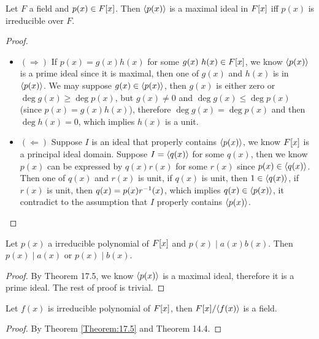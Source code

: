 \documentclass[../main.tex]{subfiles}
\begin{document}
\setcounter{theorem}{4}
\begin{theorem}
  \label{Theorem:17.5}
  Let $F$ a field and $p(x) \in F[x]$. Then $\langle p(x) \rangle$ is a maximal ideal
  in $F[x]$ iff $p(x)$ is irreducible over $F$.
\end{theorem}
\begin{proof}
  ~
  \begin{itemize}
    \item $(\Rightarrow)$ If $p(x) = g(x)h(x)$ for some $g(x) \ h(x) \in F[x]$,
          we know $\langle p(x) \rangle$ is a prime ideal since it is maximal, then one of
          $g(x)$ and $h(x)$ is in $\langle p(x) \rangle$. We may suppose $g(x) \in \langle p(x) \rangle$,
          then $g(x)$ is either zero or $\deg g(x) \ge \deg p(x)$,
          but $g(x) \neq 0$ and $\deg g(x) \leq \deg p(x)$ (since $p(x) = g(x)h(x)$), 
          therefore $\deg g(x) = \deg p(x)$ and then $\deg h(x) = 0$, which implies $h(x)$
          is a unit.
    \item $(\Leftarrow)$ Suppose $I$ is an ideal that properly contains $\langle p(x) \rangle$,
          we know $F[x]$ is a principal ideal domain.
          Suppose $I = \langle q(x) \rangle$ for some $q(x)$, then we know $p(x)$
          can be expressed by $q(x)r(x)$ for some $r(x)$ since $p(x) \in \langle q(x) \rangle$.
          Then one of $q(x)$ and $r(x)$ is unit, if $q(x)$ is unit, then $1 \in \langle q(x) \rangle$,
          if $r(x)$ is unit, then $q(x) = p(x)r^{-1}(x)$, which implies $q(x) \in \langle p(x) \rangle$,
          it contradict to the assumption that $I$ properly contains $\langle p(x) \rangle$.
  \end{itemize}
\end{proof}

\begin{corollary}
  Let $p(x)$ a irreducible polynomial of $F[x]$ and $p(x) \mid a(x)b(x)$.
  Then $p(x) \mid a(x)$ or $p(x) \mid b(x)$.
\end{corollary}
\begin{proof}
  By Theorem 17.5, we know $\langle p(x) \rangle$ is a maximal ideal, therefore it is a
  prime ideal. The rest of proof is trivial.
\end{proof}

\begin{corollary}
  \label{Corollary:17.2}
  Let $f(x)$ is irreducible polynomial of $F[x]$, then $F[x]/\langle f(x) \rangle$
  is a field.
\end{corollary}
\begin{proof}
  By Theorem \ref{Theorem:17.5} and Theorem 14.4.
\end{proof}
\end{document}
